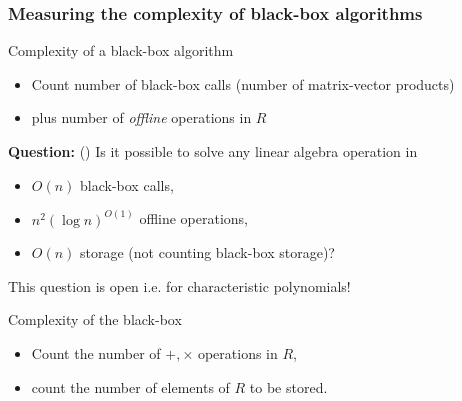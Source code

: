 \documentclass[10pt]{beamer}
\begin{document}
\begin{frame}
  \frametitle{Measuring the complexity of black-box algorithms}

  \begin{block}{Complexity of a black-box algorithm}
    \begin{itemize}
    \item Count number of black-box calls (number of matrix-vector products)
    \item plus number of \emph{offline} operations in $R$
    \end{itemize}

    \textbf{Question:} (\cite{Ka2k}) Is it possible to solve any
    linear algebra operation in
    \begin{itemize}
    \item $O(n)$ black-box calls,
    \item $n^2(\log n)^{O(1)}$ offline operations,
    \item $O(n)$ storage (not counting black-box storage)?
    \end{itemize}

    \begin{center}
      \alert{This question is open i.e. for characteristic polynomials!}
    \end{center}
  \end{block}

  \begin{block}{Complexity of the black-box}
    \begin{itemize}
    \item Count the number of $+, \times$ operations in $R$,
    \item count the number of elements of $R$ to be stored.
    \end{itemize}
  \end{block}
\end{frame}

\end{document}
